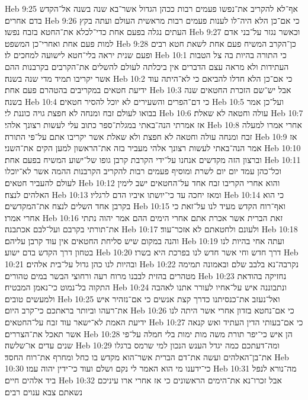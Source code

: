 Heb 9:25  אף־לא להקריב את־נפשו פעמים רבות ככהן הגדול אשר־בא שנה בשנה אל־הקדש בדם אחרים׃
Heb 9:26  כי אם־כן הלא היה־לו לענות פעמים רבות מראשית העולם ועתה בקץ העתים נגלה בפעם אחת כדי־לכלא את־החטא בזבח נפשו׃
Heb 9:27  וכאשר נגזר על־בני אדם למות פעם אחת ואחרי־כן המשפט׃
Heb 9:28  כן־הקרב המשיח פעם אחת לשאת חטא רבים ופעם שנית יראה בלי־חטא לישועה למחכים לו׃
Heb 10:1  כי התורה בהיות בה צל הטבות העתידות ולא מראה עצם הדברים אין ביכלתה לעולם להשלים את־הקרבים בקרבנות ההם אשר יקריבו תמיד מדי שנה בשנה׃
Heb 10:2  כי אם־כן הלא חדלו להביאם כי לא־היתה עוד ידיעת חטאים במקריבים בהטהרם פעם אחת׃
Heb 10:3  אבל יש־שם הזכרת החטאים שנה בשנה׃
Heb 10:4  כי דם־הפרים והשעירים לא יוכל להסיר חטאים׃
Heb 10:5  ועל־כן אמר בבואו לעולם זבח ומנחה לא חפצת גויה כוננת לי׃
Heb 10:6  עולה וחטאה לא שאלת׃
Heb 10:7  אז אמרתי הנה־באתי במגלת־ספר כתוב עלי לעשות רצונך אלהי׃
Heb 10:8  אחרי אמרו למעלה זבח ומנחה עולה וחטאה לא חפצת ולא שאלת אשר יקריבו אתם על־פי התורה׃
Heb 10:9  אז אמר הנה־באתי לעשות רצונך אלהי מעביר בזה את־הראשון למען הקים את־השני׃
Heb 10:10  וברצון הזה מקדשים אנחנו על־ידי הקרבת קרבן גופו של־ישוע המשיח בפעם אחת׃
Heb 10:11  וכל־כהן עמד יום יום לשרת ומוסיף פעמים רבות להקריב הקרבנות ההמה אשר לא־יוכלו לעולם להעביר חטאים׃
Heb 10:12  והוא אחרי הקריבו זבח אחד על־החטאים ישב לימין האלהים לנצח׃
Heb 10:13  ומאז יחכה עד כי־יושתו איביו הדם לרגליו׃
Heb 10:14  כי הוא בקרבן אחד השלים לנצח את־המקדשים׃
Heb 10:15  ואף־רוח הקדש מעיד לנו על־זאת כי אחרי אמרו׃
Heb 10:16  זאת הברית אשר אכרת אתם אחרי הימים ההם אמר יהוה נתתי את־תורתי בקרבם ועל־לבם אכתבנה׃
Heb 10:17  ולעונם ולחטאתם לא אזכר־עוד׃
Heb 10:18  והנה במקום שיש סליחת החטאים אין עוד קרבן עליהם׃
Heb 10:19  ועתה אחי בהיות לנו בטחון דרך הקדש בדם ישוע׃
Heb 10:20  דרך חדש וחי אשר חדש לנו בפרכת היא בשרו׃
Heb 10:21  ובהיות לנו כהן גדול על־בית אלהים׃
Heb 10:22  נקרבה־נא בלבב שלם ובאמונה תמימה מטהרים בהזית לבבנו מרוח רעה ורחוצי הבשר במים טהורים׃
Heb 10:23  נחזיקה בהודאת התקוה בל־נמוט כי־נאמן המבטיח׃
Heb 10:24  ונתבוננה איש על־אחיו לעורר אתנו לאהבה ולמעשים טובים׃
Heb 10:25  ואל־נעזב את־כנסיתנו כדרך קצת אנשים כי אם־נזהיר איש את־רעהו וביותר בראתכם כי־קרב היום׃
Heb 10:26  כי אם־נחטא בזדון אחרי אשר היתה לנו ידיעת האמת לא־ישאר עוד זבח על־החטאים׃
Heb 10:27  כי אם־בעותי הדין העתיד ואש קנאה אשר תאכל את־הצררים׃
Heb 10:28  הן איש כי־יפר תורת משה מות ימות בלי חמלה על־פי שנים עדים או־שלשה׃
Heb 10:29  ומה־דעתכם כמה יגדל הענש הנכון למי שרמס ברגלו את־בן־האלהים ועשה את־דם הברית אשר־הוא מקדש בו כחל ומחרף את־רוח החסד׃
Heb 10:30  כי־ידענו מי הוא האמר לי נקם ושלם ועוד כי־ידין יהוה עמו׃
Heb 10:31  מה־נורא לנפל ביד אלהים חיים׃
Heb 10:32  אבל זכרו־נא את־הימים הראשונים כי אז אחרי ארו עיניכם נשאתם צבא ענוים רבים׃
